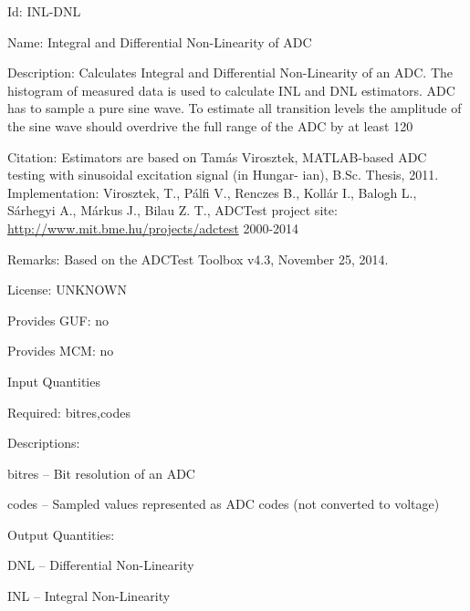 \begin{tightdesc}
\item [Id:] INL-DNL
\item [Name:] Integral and Differential Non-Linearity of ADC
\item [Description:] Calculates Integral and Differential Non-Linearity of an ADC. The histogram of measured data is used to calculate INL and DNL estimators. ADC has to sample a pure sine wave. To estimate all transition levels the amplitude of the sine wave should overdrive the full range of the ADC by at least 120%
\item [Citation:] Estimators are based on Tamás Virosztek, MATLAB-based ADC testing with sinusoidal excitation signal (in Hungar- ian), B.Sc. Thesis, 2011. Implementation: Virosztek, T., Pálfi V., Renczes B., Kollár I., Balogh L., Sárhegyi A., Márkus J., Bilau Z. T., ADCTest project site: \url{http://www.mit.bme.hu/projects/adctest} 2000-2014
\item [Remarks:] Based on the ADCTest Toolbox v4.3, November 25, 2014.
\item [License:] UNKNOWN
\item [Provides GUF:] no
\item [Provides MCM:] no
\item [Input Quantities] \rule{0em}{0em}
    \begin{tightdesc}
    \item [Required:] 
        \textsf{bitres},\enspace \textsf{codes}
    \item [Descriptions:] \rule{0em}{0em}
        \begin{tightdesc}
            \item[\textsf{bitres}] -- Bit resolution of an ADC
            \item[\textsf{codes}] -- Sampled values represented as ADC codes (not converted to voltage)
        \end{tightdesc}
    \end{tightdesc}
\item [Output Quantities:] \rule{0em}{0em}
    \begin{tightdesc}
        \item[\textsf{DNL}] -- Differential Non-Linearity
        \item[\textsf{INL}] -- Integral Non-Linearity
    \end{tightdesc}
\end{tightdesc}
